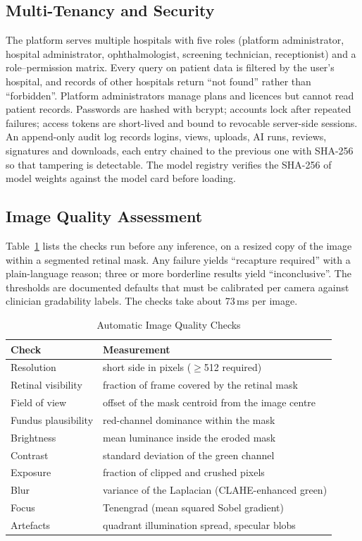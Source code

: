 \documentclass[conference]{IEEEtran}
\begin{document}
\subsection{Multi-Tenancy and Security}
The platform serves multiple hospitals with five roles (platform administrator, hospital administrator,
ophthalmologist, screening technician, receptionist) and a role--permission matrix. Every query on patient data is
filtered by the user's hospital, and records of other hospitals return ``not found'' rather than ``forbidden''.
Platform administrators manage plans and licences but cannot read patient records. Passwords are hashed with bcrypt;
accounts lock after repeated failures; access tokens are short-lived and bound to revocable server-side sessions. An
append-only audit log records logins, views, uploads, AI runs, reviews, signatures and downloads, each entry chained
to the previous one with SHA-256 so that tampering is detectable. The model registry verifies the SHA-256 of model
weights against the model card before loading.

\subsection{Image Quality Assessment}
Table~\ref{tab:iqa} lists the checks run before any inference, on a resized copy of the image within a segmented
retinal mask. Any failure yields ``recapture required'' with a plain-language reason; three or more borderline results
yield ``inconclusive''. The thresholds are documented defaults that must be calibrated per camera against clinician
gradability labels. The checks take about 73\,ms per image.

\begin{table}[t]
\caption{Automatic Image Quality Checks}
\label{tab:iqa}
\centering\scriptsize
\begin{tabular}{@{}ll@{}}
\toprule
Check & Measurement \\
\midrule
Resolution & short side in pixels ($\geq$512 required) \\
Retinal visibility & fraction of frame covered by the retinal mask \\
Field of view & offset of the mask centroid from the image centre \\
Fundus plausibility & red-channel dominance within the mask \\
Brightness & mean luminance inside the eroded mask \\
Contrast & standard deviation of the green channel \\
Exposure & fraction of clipped and crushed pixels \\
Blur & variance of the Laplacian (CLAHE-enhanced green) \\
Focus & Tenengrad (mean squared Sobel gradient) \\
Artefacts & quadrant illumination spread, specular blobs \\
\bottomrule
\end{tabular}
\end{table}
\end{document}
